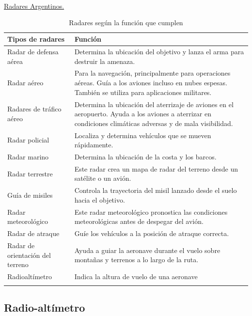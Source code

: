 \href{https://www.gacetaeronautica.com/gaceta/wp-101/?p=22386}{Radares Argentinos.}


\begin{table}[!h]
  \centering
  \begin{tabular}{m{}m{}} \hline \rowcolor{cyan!30}
   \textbf{Tipos de radares} & \textbf{	Función} \\ \hline
Radar de defensa aérea &	Determina la ubicación del objetivo y lanza el arma para destruir la amenaza. \\ \rowcolor{cyan!15}
Radar aéreo 	& Para la navegación, principalmente para operaciones aéreas. Guía a los aviones incluso en nubes espesas. También se utiliza para aplicaciones militares. \\
Radares de tráfico aéreo &	Determina la ubicación del aterrizaje de aviones en el aeropuerto. Ayuda a los aviones a aterrizar en condiciones climáticas adversas y de mala visibilidad. \\  \rowcolor{cyan!15}
Radar policial &	Localiza y determina vehículos que se mueven rápidamente. \\
Radar marino 	& Determina la ubicación de la costa y los barcos. \\  \rowcolor{cyan!15}
Radar terrestre &	Este radar crea un mapa de radar del terreno desde un satélite o un avión. \\
Guía de misiles &	Controla la trayectoria del misil lanzado desde el suelo hacia el objetivo. \\ \rowcolor{cyan!15}
Radar meteorológico &	Este radar meteorológico pronostica las condiciones meteorológicas antes de despegar del avión. \\
Radar de atraque &	Guíe los vehículos a la posición de atraque correcta. \\ \rowcolor{cyan!15}
    Radar de orientación del terreno  &	Ayuda a guiar la aeronave durante el vuelo sobre montañas y terrenos a lo largo de la ruta. \\
    Radioaltímetro & Indica la altura de vuelo de una aeronave \\ \hline
    \\ \hline
  \end{tabular}
  \caption{Radares según la función que cumplen}
  \label{tab:06.Radar.segunFuncion}
\end{table}


\subsection{Radio-alt\'imetro}
\label{sec:U06.05.radio.altimetro}

